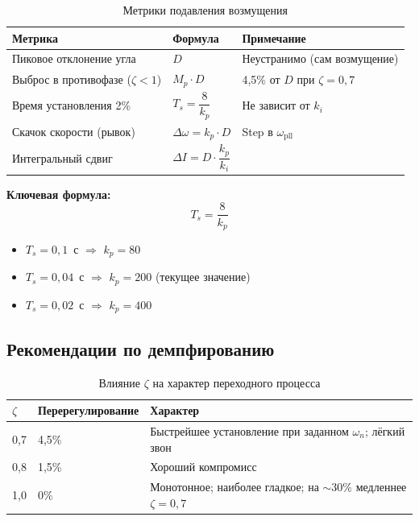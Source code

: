 \documentclass[12pt,a4paper]{article}
\begin{document}
\begin{table}[H]
\centering
\caption{Метрики подавления возмущения}
\begin{tabular}{lll}
\toprule
Метрика & Формула & Примечание \\
\midrule
Пиковое отклонение угла & $D$ & Неустранимо (сам возмущение) \\
Выброс в противофазе ($\zeta<1$) & $M_p \cdot D$ & 4{,}5\% от $D$ при $\zeta=0{,}7$ \\
Время установления 2\% & $T_s = \dfrac{8}{k_p}$ & Не зависит от $k_i$ \\
Скачок скорости (рывок) & $\Delta\omega = k_p \cdot D$ & Step в $\omega_\text{pll}$ \\
Интегральный сдвиг & $\Delta I = D \cdot \dfrac{k_p}{k_i}$ & \\
\bottomrule
\end{tabular}
\end{table}

\textbf{Ключевая формула:}
\begin{equation}
  \boxed{T_s = \frac{8}{k_p}}
  \label{eq:ts}
\end{equation}

\begin{itemize}
  \item $T_s = 0{,}1$~с $\Rightarrow$ $k_p = 80$
  \item $T_s = 0{,}04$~с $\Rightarrow$ $k_p = 200$ (текущее значение)
  \item $T_s = 0{,}02$~с $\Rightarrow$ $k_p = 400$
\end{itemize}

\subsection{Рекомендации по демпфированию}

\begin{table}[H]
\centering
\caption{Влияние $\zeta$ на характер переходного процесса}
\begin{tabular}{lll}
\toprule
$\zeta$ & Перерегулирование & Характер \\
\midrule
0{,}7 & 4{,}5\% & Быстрейшее установление при заданном $\omega_n$; лёгкий звон \\
0{,}8 & 1{,}5\% & Хороший компромисс \\
1{,}0 & 0\% & Монотонное; наиболее гладкое; на $\sim$30\% медленнее $\zeta=0{,}7$ \\
\bottomrule
\end{tabular}
\end{table}
\end{document}
